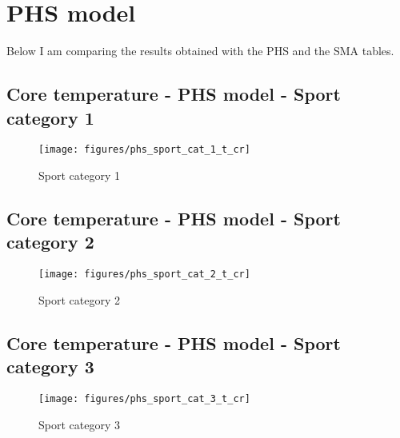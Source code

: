 \documentclass[11pt]{article}
\begin{document}
    \clearpage

    \section{PHS model}\label{sec:phs-model}

    Below I am comparing the results obtained with the PHS and the SMA tables.

%

    \subsection{Core temperature - PHS model - Sport category 1}
    \begin{figure}[htb!]
        \centering
        \texttt{[image: figures/phs\_sport\_cat\_1\_t\_cr]}
        \caption{Sport category 1}\label{fig:phs_sport_cat_1}
    \end{figure}

    \clearpage

    \subsection{Core temperature - PHS model - Sport category 2}
    \begin{figure}[htb!]
        \centering
        \texttt{[image: figures/phs\_sport\_cat\_2\_t\_cr]}
        \caption{Sport category 2}\label{fig:phs_sport_cat_2}
    \end{figure}

    \clearpage

    \subsection{Core temperature - PHS model - Sport category 3}
    \begin{figure}[htb!]
        \centering
        \texttt{[image: figures/phs\_sport\_cat\_3\_t\_cr]}
        \caption{Sport category 3}\label{fig:phs_sport_cat_3}
    \end{figure}

    \clearpage
\end{document}
